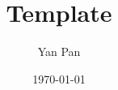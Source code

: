 \documentclass{beamer}
\title{Template}
\author{Yan Pan}
\institute{Carnegie Mellon University}
\date{\today}
\begin{document}
\frame{\titlepage}
\end{document}
